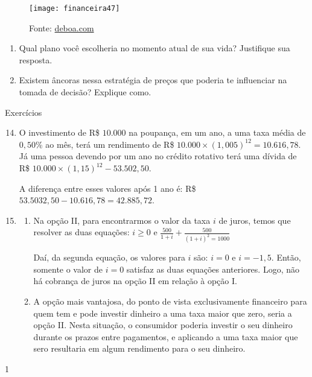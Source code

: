 \begin{enumerate}
  \begin{figure}[H]
  \centering

  \texttt{[image: financeira47]}
  \caption{Fonte: \href{http://brasilia.deboa.com/dicas-descontos/academia-esportiva-status-planos-com-desconto. }{deboa.com}}
  \end{figure}

  \begin{enumerate}
  \item Qual plano você escolheria no momento atual de sua vida? Justifique sua resposta.
  \item Existem âncoras nessa estratégia de preços que poderia te influenciar na tomada de decisão? Explique como.
  \end{enumerate}
\end{enumerate}
\clearpage
\begin{resposta}{Exercícios}
{
  \begin{enumerate}\setcounter{enumi}{13}
    \item O investimento de R\$ $10.000$ na poupança, em um ano, a uma taxa média de $0{,}50$\% ao mês, terá um rendimento de R\$ $10.000\times (1{,}005)^12=10.616{,}78$. Já uma pessoa devendo por um ano no crédito rotativo terá uma dívida de R\$ $10.000\times(1{,}15)^12-53.502{,}50$.

    A diferença entre esses valores após 1 ano é: R\$ $53.5032{,}50-10.616{,}78=42.885{,}72$. 

    \item
    \begin{enumerate}
      \item Na opção II, para encontrarmos o valor da taxa $i$ de juros, temos que resolver as duas equações: $i\geq0$ e $\displaystyle\frac{500}{1+i}+\frac{500}{(1+i)^2=1000}$

      Daí, da segunda equação, os valores para $i$ são: $i=0$ e $i=-1{,}5$. Então, somente o valor de $i=0$ satisfaz as duas equações anteriores. Logo, não há cobrança de juros na opção II em relação à opção I.

      \item A opção mais vantajosa, do ponto de vista exclusivamente financeiro para quem tem e pode investir dinheiro a uma taxa  maior que zero, seria a opção II. Nesta situação, o consumidor poderia investir o seu dinheiro durante os prazos entre pagamentos, e aplicando a uma taxa maior que sero resultaria em algum rendimento para o seu dinheiro.
    \end{enumerate}
  \end{enumerate}
}{1}
\end{resposta}
